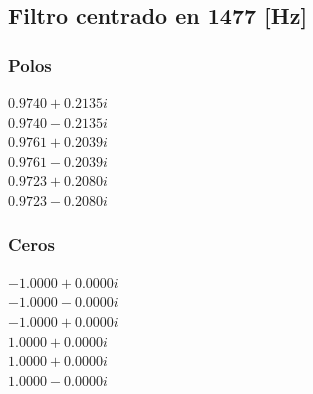 \subsection*{Filtro centrado en 1477 [Hz]}
\begin{multicols}{2}
  \subsubsection*{Polos}
  $0.9740 + 0.2135i$\\
  $0.9740 - 0.2135i$\\
  $0.9761 + 0.2039i$\\
  $0.9761 - 0.2039i$\\
  $0.9723 + 0.2080i$\\
  $0.9723 - 0.2080i$\\

  \columnbreak
  \subsubsection*{Ceros}
  $-1.0000 + 0.0000i$\\
  $-1.0000 - 0.0000i$\\
  $-1.0000 + 0.0000i$\\
  $1.0000 + 0.0000i$\\
  $1.0000 + 0.0000i$\\
  $1.0000 - 0.0000i$\\
\end{multicols}
